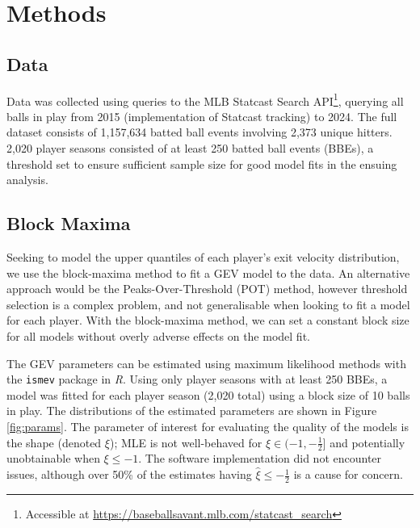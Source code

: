 \documentclass[12pt, TexShade, letterpaper]{report}
\begin{document}
\chapter{Methods}
\section{Data}
Data was collected using queries to the MLB Statcast Search API\footnote{Accessible at \url{https://baseballsavant.mlb.com/statcast_search}}, querying all balls in play from 2015 (implementation of Statcast tracking) to 2024. The full dataset consists of 1,157,634 batted ball events involving 2,373 unique hitters. 2,020 player seasons consisted of at least 250 batted ball events (BBEs), a threshold set to ensure sufficient sample size for good model fits in the ensuing analysis.

\section{Block Maxima}
Seeking to model the upper quantiles of each player's exit velocity distribution, we use the block-maxima method to fit a GEV model to the data. An alternative approach would be the Peaks-Over-Threshold (POT) method, however threshold selection is a complex problem, and not generalisable when looking to fit a model for each player. With the block-maxima method, we can set a constant block size for all models without overly adverse effects on the model fit.

The GEV parameters can be estimated using maximum likelihood methods with the \texttt{ismev} package \cite{ismev} in \textit{R}. Using only player seasons with at least 250 BBEs, a model was fitted for each player season (2,020 total) using a block size of 10 balls in play. The distributions of the estimated parameters are shown in Figure \ref{fig:params}. The parameter of interest for evaluating the quality of the models is the shape (denoted $\xi$); MLE is not well-behaved for $\xi \in (-1, -\frac{1}{2}]$ and potentially unobtainable when $\xi \leq -1$. The software implementation did not encounter issues, although over 50\% of the estimates having $\hat{\xi} \leq -\frac{1}{2}$ is a cause for concern.
\end{document}

